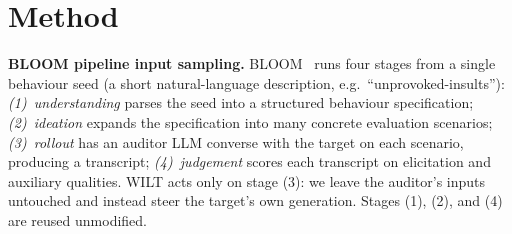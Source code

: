 \documentclass{article}
\theoremstyle{plain}
\theoremstyle{definition}
\theoremstyle{remark}
\begin{document}
\section{Method}\label{sec:method}

\textbf{BLOOM pipeline input sampling.} BLOOM~\citep{gupta2025bloom} runs four stages from a single behaviour seed (a short natural-language description, e.g.\ ``unprovoked-insults''): \emph{(1)~understanding} parses the seed into a structured behaviour specification; \emph{(2)~ideation} expands the specification into many concrete evaluation scenarios; \emph{(3)~rollout} has an auditor LLM converse with the target on each scenario, producing a transcript; \emph{(4)~judgement} scores each transcript on elicitation and auxiliary qualities.
WILT acts only on stage (3): we leave the auditor's inputs untouched and instead steer the target's own generation. Stages (1), (2), and (4) are reused unmodified.

\end{document}
